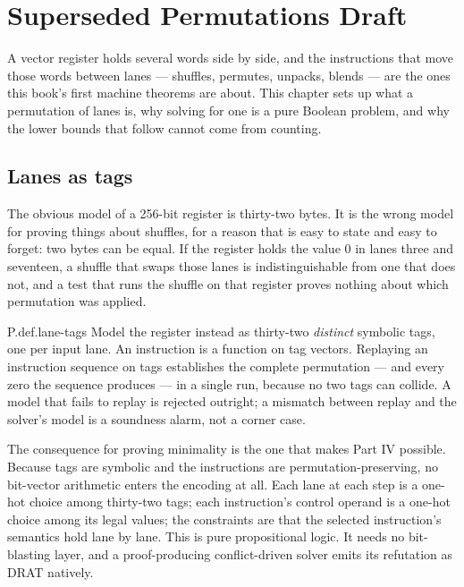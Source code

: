\chapter{Superseded Permutations Draft}
\label{ch:permutations}

A vector register holds several words side by side, and the instructions that move those words between lanes --- shuffles, permutes, unpacks, blends --- are the ones this book's first machine theorems are about. This chapter sets up what a permutation of lanes is, why solving for one is a pure Boolean problem, and why the lower bounds that follow cannot come from counting.

\section{Lanes as tags}
\label{sec:tags}

The obvious model of a 256-bit register is thirty-two bytes. It is the wrong model for proving things about shuffles, for a reason that is easy to state and easy to forget: two bytes can be equal. If the register holds the value \(0\) in lanes three and seventeen, a shuffle that swaps those lanes is indistinguishable from one that does not, and a test that runs the shuffle on that register proves nothing about which permutation was applied.

\begin{artifact}{P.def.lane-tags}
Model the register instead as thirty-two \emph{distinct} symbolic tags, one per input lane. An instruction is a function on tag vectors. Replaying an instruction sequence on tags establishes the complete permutation --- and every zero the sequence produces --- in a single run, because no two tags can collide. A model that fails to replay is rejected outright; a mismatch between replay and the solver's model is a soundness alarm, not a corner case.
\end{artifact}

The consequence for proving minimality is the one that makes Part IV possible. Because tags are symbolic and the instructions are permutation-preserving, no bit-vector arithmetic enters the encoding at all. Each lane at each step is a one-hot choice among thirty-two tags; each instruction's control operand is a one-hot choice among its legal values; the constraints are that the selected instruction's semantics hold lane by lane. This is pure propositional logic. It needs no bit-blasting layer, and a proof-producing conflict-driven solver emits its refutation as DRAT natively.

